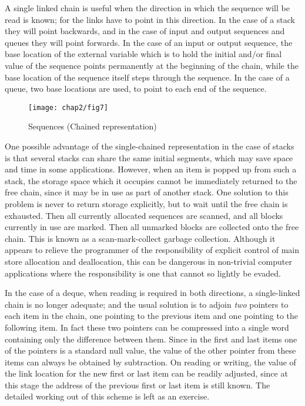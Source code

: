 A single linked chain is useful when the direction in which the sequence will be read is known; for the links have to point in this direction. In the case of a stack they will point backwards, and in the case of input and output sequences and queues they will point forwards. In the case of an input or output sequence, the base location of the external variable which is to hold the initial and$/$or final value of the sequence points permanently at the beginning of the chain, while the base location of the sequence itself steps through the sequence. In the case of a queue, two base locations are used, to point to each end of the sequence.

\begin{figure}[h]
	\centering
	\texttt{[image: chap2/fig7]}
	\caption{Sequences (Chained representation)}
\end{figure}

One possible advantage of the single-chained representation in the case of stacks is that several stacks can share the same initial segments, which may save space and time in some applications. However, when an item is popped up from such a stack, the storage space which it occupies cannot be immediately returned to the free chain, since it may be in use as part of another stack. One solution to this problem is never to return storage explicitly, but to wait until the free chain is exhausted. Then all currently allocated sequences are scanned, and all blocks currently in use are marked. Then all unmarked blocks are collected onto the free chain. This is known as a scan-mark-collect garbage collection. Although it appears to relieve the programmer of the responsibility of explicit control of main store allocation and deallocation, this can be dangerous in non-trivial computer applications where the responsibility is one that cannot so lightly be evaded.

In the case of a deque, when reading is required in both directions, a single-linked chain is no longer adequate; and the usual solution is to adjoin \textit{two} pointers to each item in the chain, one pointing to the previous item and one pointing to the following item. In fact these two pointers can be compressed into a single word containing only the difference between them. Since in the first and last items one of the pointers is a standard null value, the value of the other pointer from these items can always be obtained by subtraction. On reading or writing, the value of the link location for the new first or last item can be readily adjusted, since at this stage the address of the previous first or last item is still known. The detailed working out of this scheme is left as an exercise.

